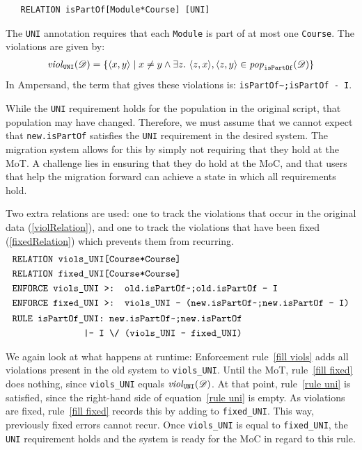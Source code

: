 \documentclass[runningheads]{llncs}
\newcommand{\id}[1]{\text{\it #1\/}}
\newcommand{\popF}[1]{\id{pop}_{#1}}
\newcommand{\pop}[2]{\popF{#1}(#2)}
\newcommand{\viol}[2]{\violC{#1}(#2)}
\newcommand{\violC}[1]{\id{viol}_{#1}}
\newcommand{\pair}[2]{\langle{#1},{#2}\rangle}
\newcommand{\dataset}{\mathscr{D}}
\begin{document}
\begin{verbatim}
   RELATION isPartOf[Module*Course] [UNI]
\end{verbatim}
   
   The \verb=UNI= annotation requires that each \verb=Module= is part of at most one \verb=Course=.
   The violations are given by:
\begin{eqnarray}
   \viol{\tt UNI}{\dataset} = \{\pair{x}{y} \mid x \neq y \wedge \exists z.~ \pair{z}{x}, \pair{z}{y}\in\pop{\tt isPartOf}{\dataset} \}
\end{eqnarray}
   In Ampersand, the term that gives these violations is: \verb=isPartOf~;isPartOf - I=.
   
   While the \verb=UNI= requirement holds for the population in the original script, that population may have changed.
   Therefore, we must assume that we cannot expect that \verb=new.isPartOf= satisfies the \verb=UNI= requirement in the desired system.
   The migration system allows for this by simply not requiring that they hold at the MoT.
   A challenge lies in ensuring that they do hold at the MoC, and that users that help the migration forward can achieve a state in which all requirements hold.
   
   Two extra relations are used: one to track the violations that occur in the original data (\ref{violRelation}), and one to track the violations that have been fixed (\ref{fixedRelation}) which prevents them from recurring.
\begin{align}
   &\text{\tt RELATION viols\_UNI[Course*Course]}\label{violRelation}\\
   &\text{\tt RELATION fixed\_UNI[Course*Course]}\label{fixedRelation}\\
   &\text{\tt ENFORCE viols\_UNI >: old.isPartOf\textasciitilde;old.isPartOf - I}\label{fill viols}\\
   &\text{\tt ENFORCE fixed\_UNI >: viols\_UNI - (new.isPartOf\textasciitilde;new.isPartOf - I)}\label{fill fixed}\\
   &\begin{aligned}
   \text{\tt RULE isPartOf\_UNI: new.isPartOf\textasciitilde;new.isPartOf}\\
   \quad\text{\tt |- I \textbackslash/ (viols\_UNI - fixed\_UNI)}
   \end{aligned}\label{rule uni}
\end{align}
   
   We again look at what happens at runtime:
   Enforcement rule~\ref{fill viols} adds all violations present in the old system to {\tt viols\_UNI}.
   Until the MoT, rule~\ref{fill fixed} does nothing, since {\tt viols\_UNI} equals $\viol{\tt UNI}{\dataset}$.
   At that point, rule~\ref{rule uni} is satisfied, since the right-hand side of equation~\ref{rule uni} is empty.
   As violations are fixed, rule~\ref{fill fixed} records this by adding to {\tt fixed\_UNI}.
   This way, previously fixed errors cannot recur.
   Once {\tt viols\_UNI} is equal to {\tt fixed\_UNI}, the \verb=UNI= requirement holds and the system is ready for the MoC in regard to this rule.
   
\end{document}
